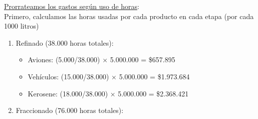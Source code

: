 \documentclass[10pt,a4paper]{article}
\begin{document}
\begin{enumerate}[label=\textbf{\sffamily\large\arabic*.}]
\begin{itemize}
    \end{itemize}

    \underline{Prorrateamos los gastos según uso de horas}: \\

    Primero, calculamos las horas usadas por cada producto en cada etapa (por cada 1000 litros)

    \begin{center}
    \end{center}

    \vspace{0.5em}

    \begin{enumerate}[label=\alph*)]

        \item Refinado (38.000 horas totales):
        
        \begin{itemize}

            \item Aviones: (5.000/38.000) × 5.000.000 = \$657.895
            \item Vehículos: (15.000/38.000) × 5.000.000 = \$1.973.684
            \item Kerosene: (18.000/38.000) × 5.000.000 = \$2.368.421 \\
    
        \end{itemize}

        \item Fraccionado (76.000 horas totales):
        
        \begin{itemize}


\end{itemize}
\end{enumerate}
\end{enumerate}
\end{document}
